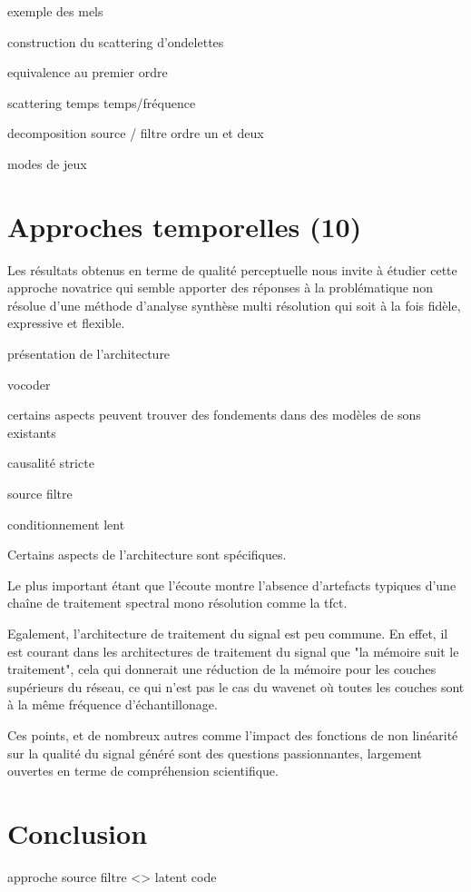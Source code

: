 exemple des mels

construction du scattering d'ondelettes

equivalence au premier ordre



scattering temps temps/fréquence \cite{anden2014deep}

decomposition source / filtre ordre un et deux

modes de jeux




\section{Approches temporelles (10)}

\cite{wavenet}

Les résultats obtenus en terme de qualité perceptuelle nous invite à étudier cette approche novatrice qui semble apporter des réponses à la problématique non résolue d'une méthode d'analyse synthèse multi résolution qui soit à la fois fidèle, expressive et flexible.

présentation de l'architecture

vocoder

certains aspects peuvent trouver des fondements dans des modèles de sons existants

causalité stricte

source filtre

conditionnement lent

Certains aspects de l'architecture sont spécifiques.

Le plus important étant que l'écoute montre l'absence d'artefacts typiques d'une chaîne de traitement spectral mono résolution comme la tfct.

Egalement, l'architecture de traitement du signal est peu commune. En effet, il est courant dans les architectures de traitement du signal que "la mémoire suit le traitement", cela qui donnerait une réduction de la mémoire pour les couches supérieurs du réseau, ce qui n'est pas le cas du wavenet où toutes les couches sont à la même fréquence d'échantillonage.

Ces points, et de nombreux autres comme l'impact des fonctions de non linéarité sur la qualité du signal généré sont des questions passionnantes, largement ouvertes en terme de compréhension scientifique.

\section{Conclusion}

approche source filtre <> latent code
